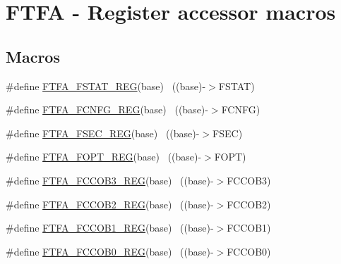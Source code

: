 \hypertarget{group___f_t_f_a___register___accessor___macros}{}\section{F\+T\+FA -\/ Register accessor macros}
\label{group___f_t_f_a___register___accessor___macros}
\subsection*{Macros}
\begin{DoxyCompactItemize}
\item 
\#define \hyperlink{group___f_t_f_a___register___accessor___macros_ga4736ffce69a4d6973d823deb6cad1f52}{F\+T\+F\+A\+\_\+\+F\+S\+T\+A\+T\+\_\+\+R\+EG}(base)                                      ~((base)-\/$>$F\+S\+T\+AT)
\item 
\#define \hyperlink{group___f_t_f_a___register___accessor___macros_gacd9acc933e344c7de9bd34f88bd82fc1}{F\+T\+F\+A\+\_\+\+F\+C\+N\+F\+G\+\_\+\+R\+EG}(base)                                      ~((base)-\/$>$F\+C\+N\+FG)
\item 
\#define \hyperlink{group___f_t_f_a___register___accessor___macros_ga05d271787e423430f534b76acd41234f}{F\+T\+F\+A\+\_\+\+F\+S\+E\+C\+\_\+\+R\+EG}(base)                                        ~((base)-\/$>$F\+S\+EC)
\item 
\#define \hyperlink{group___f_t_f_a___register___accessor___macros_gaf40941d14954024566aa2bbdf158636a}{F\+T\+F\+A\+\_\+\+F\+O\+P\+T\+\_\+\+R\+EG}(base)                                        ~((base)-\/$>$F\+O\+PT)
\item 
\#define \hyperlink{group___f_t_f_a___register___accessor___macros_ga66adfe5c9b6f0b063463a79fc6aa2b60}{F\+T\+F\+A\+\_\+\+F\+C\+C\+O\+B3\+\_\+\+R\+EG}(base)                                    ~((base)-\/$>$F\+C\+C\+O\+B3)
\item 
\#define \hyperlink{group___f_t_f_a___register___accessor___macros_gab670a16b2be6350488094c33af5fe8a7}{F\+T\+F\+A\+\_\+\+F\+C\+C\+O\+B2\+\_\+\+R\+EG}(base)                                    ~((base)-\/$>$F\+C\+C\+O\+B2)
\item 
\#define \hyperlink{group___f_t_f_a___register___accessor___macros_ga59909e19707bf8b69be73626113cbadc}{F\+T\+F\+A\+\_\+\+F\+C\+C\+O\+B1\+\_\+\+R\+EG}(base)                                    ~((base)-\/$>$F\+C\+C\+O\+B1)
\item 
\#define \hyperlink{group___f_t_f_a___register___accessor___macros_ga6f52f43f250445e9c48fef1fdaff3116}{F\+T\+F\+A\+\_\+\+F\+C\+C\+O\+B0\+\_\+\+R\+EG}(base)                                    ~((base)-\/$>$F\+C\+C\+O\+B0)

\end{DoxyCompactItemize}
